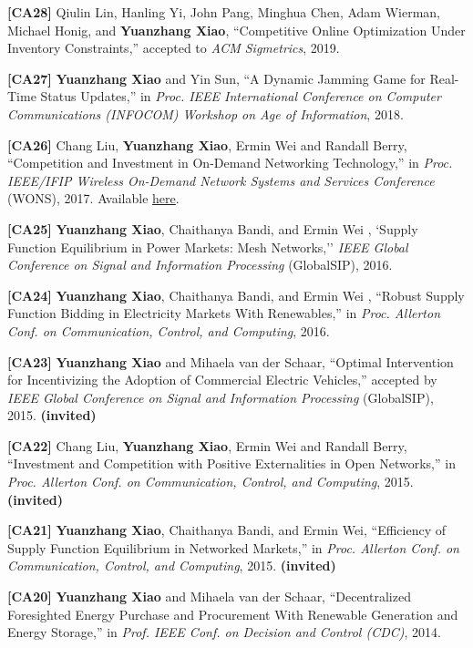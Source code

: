 \documentclass[margin,line]{res}
\begin{document}
\begin{resume}
\vspace{-.3cm}

\textbf{[CA28]}
Qiulin Lin, Hanling Yi, John Pang, Minghua Chen, Adam Wierman, Michael Honig, and {\bf Yuanzhang Xiao}, ``Competitive Online Optimization Under Inventory Constraints,'' accepted to \emph{ACM Sigmetrics}, 2019.


\textbf{[CA27]}
{\bf Yuanzhang Xiao} and Yin Sun, ``A Dynamic Jamming Game for Real-Time Status Updates,'' in \emph{Proc. IEEE International Conference on Computer Communications (INFOCOM) Workshop on Age of Information}, 2018.

\textbf{[CA26]}
Chang Liu, {\bf Yuanzhang Xiao}, Ermin Wei and Randall Berry, ``Competition and Investment in On-Demand Networking Technology,'' in \emph{Proc. IEEE/IFIP Wireless On-Demand Network Systems and Services Conference} (WONS), 2017. Available \href{http://yuanzhangxiao.com/papers/Liu-XYZ-Wei-Berry-WONS2017.pdf}{here}.

\textbf{[CA25]} {\bf Yuanzhang Xiao}, Chaithanya Bandi, and Ermin Wei , `Supply Function Equilibrium in Power Markets: Mesh Networks,'' \emph{IEEE Global Conference on Signal and Information Processing} (GlobalSIP), 2016.

\textbf{[CA24]} {\bf Yuanzhang Xiao}, Chaithanya Bandi, and Ermin Wei , ``Robust Supply Function Bidding
in Electricity Markets With Renewables,'' in \emph{Proc. Allerton Conf. on Communication, Control, and Computing}, 2016.

\textbf{[CA23]} {\bf Yuanzhang Xiao} and Mihaela van der Schaar, ``Optimal Intervention for Incentivizing the Adoption of Commercial Electric Vehicles,'' accepted by \emph{IEEE Global Conference on Signal and Information Processing} (GlobalSIP), 2015. {\bf (invited)}

\textbf{[CA22]} Chang Liu, {\bf Yuanzhang Xiao}, Ermin Wei and Randall Berry, ``Investment and Competition with Positive Externalities in Open Networks,'' in \emph{Proc. Allerton Conf. on Communication, Control, and Computing}, 2015. {\bf (invited)}

\textbf{[CA21]} {\bf Yuanzhang Xiao}, Chaithanya Bandi, and Ermin Wei, ``Efficiency of Supply Function Equilibrium in Networked Markets,'' in \emph{Proc. Allerton Conf. on Communication, Control, and Computing}, 2015. {\bf (invited)}

\textbf{[CA20]} {\bf Yuanzhang Xiao} and Mihaela van der Schaar, ``Decentralized Foresighted Energy Purchase and Procurement With Renewable Generation and Energy Storage,'' in \emph{Prof. IEEE Conf. on Decision and Control (CDC)}, 2014.


\end{resume}
\end{document}

